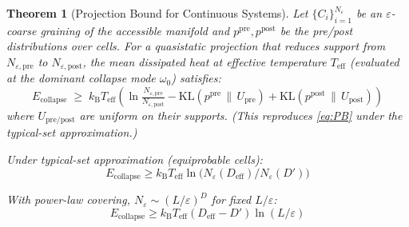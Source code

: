 \documentclass[12pt]{article}
\numberwithin{equation}{section}
\newtheorem{theorem}{Theorem}[section]
\newcommand{\kB}{k_{\mathrm{B}}}
\newcommand{\Teff}{T_{\mathrm{eff}}}
\newcommand{\KL}[2]{\mathrm{KL}\!\left(#1\,\|\,#2\right)}
\begin{document}
\begin{theorem}[Projection Bound for Continuous Systems]
\label{thm:projection}
Let $\{C_i\}_{i=1}^{N_\varepsilon}$ be an $\varepsilon$-coarse graining of the accessible manifold and $p^{\mathrm{pre}},p^{\mathrm{post}}$ be the pre/post distributions over cells. For a quasistatic projection that reduces support from $N_{\varepsilon,\mathrm{pre}}$ to $N_{\varepsilon,\mathrm{post}}$, the mean dissipated heat at effective temperature $\Teff$ (evaluated at the dominant collapse mode $\omega_0$) satisfies:
\begin{equation}
\boxed{E_{\mathrm{collapse}} \;\ge\; \kB\Teff
\left(
\ln \tfrac{N_{\varepsilon,\mathrm{pre}}}{N_{\varepsilon,\mathrm{post}}}
- \KL{p^{\mathrm{pre}}}{U_{\mathrm{pre}}}
+ \KL{p^{\mathrm{post}}}{U_{\mathrm{post}}}
\right)}
\label{eq:master}
\end{equation}
where $U_{\mathrm{pre/post}}$ are uniform on their supports. (This reproduces \eqref{eq:PB} under the typical-set approximation.)

Under typical-set approximation (equiprobable cells):
\begin{equation}
E_{\mathrm{collapse}} \ge \kB\Teff \ln\!\big(N_\varepsilon(D_{\mathrm{eff}})/N_\varepsilon(D')\big)
\end{equation}

With power-law covering, $N_\varepsilon \sim (L/\varepsilon)^D$ for fixed $L/\varepsilon$:
\begin{equation}
E_{\mathrm{collapse}} \geq \kB\Teff (D_{\mathrm{eff}} - D') \ln(L/\varepsilon)
\end{equation}
\end{theorem}
\end{document}
